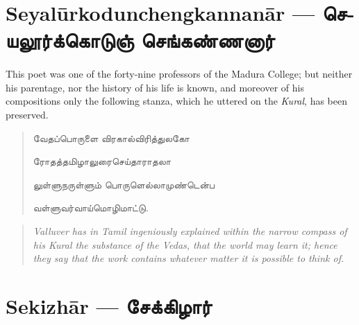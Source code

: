 \documentclass{article}
\newcommand{\TamilText}[1]{\texttamil{#1}}
\newcommand{\TamilBold}[1]{\texttamil{\textbf{#1}}}
\newcommand{\tam}[1]{\TamilText{#1}}
\newcommand{\tambold}[1]{\TamilBold{#1}}
\begin{document}
\section{Seyal\={u}rkodunchengkannan\={a}r --- \tambold{செயலூர்க்கொடுஞ் செங்கண்ணனார்}}
\paragraph{}
This poet was one of the forty-nine professors of the Madura College; but neither his parentage, nor the history of his life is known, and moreover of his compositions only the following stanza, which he uttered on the \emph{Kural}, has been preserved.
\begin{quotation}\small
\tam{வேதப்பொருளை விரகால்விரித்துலகோ}

\tam{ரோதத்தமிழாலுரைசெய்தாராதலா}

\tam{லுள்ளுநருள்ளும்‌ பொருளெல்லாமுண்டென்ப}

\tam{வள்ளுவர்வாய்மொழிமாட்டு}.
\end{quotation}
\begin{quotation}\small
\emph{Valluver has in Tamil ingeniously explained within the narrow compass of his Kural the substance of the Vedas, that the world may learn it; hence they say that the work contains whatever matter it is possible to think of.}
\end{quotation}

\section{Sekizh\={a}r --- \tambold{சேக்கிழார்}}
\end{document}
